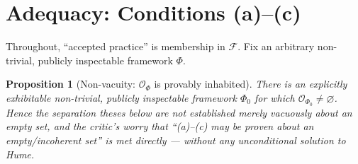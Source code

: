 \documentclass{amsart}
\theoremstyle{definition}
\theoremstyle{plain}
\newtheorem{proposition}{Proposition}
\theoremstyle{remark}
\begin{document}
\section{Adequacy: Conditions (a)--(c)}

Throughout, ``accepted practice'' is membership in $\mathcal{F}$. Fix an
arbitrary non-trivial, publicly inspectable framework $\Phi$.

\begin{proposition}[Non-vacuity: $\mathcal{O}_\Phi$ is provably inhabited]
\label{prop:nonempty}
There is an explicitly exhibitable non-trivial, publicly inspectable framework
$\Phi_0$ for which $\mathcal{O}_{\Phi_0}\neq\varnothing$. Hence the separation
theses below are not established merely \emph{vacuously} about an empty set, and
the critic's worry that ``(a)--(c) may be proven about an empty/incoherent set''
is met directly --- \emph{without} any unconditional solution to Hume.
\end{proposition}
\end{document}

